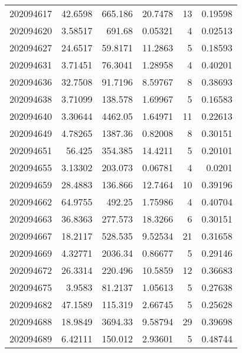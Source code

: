 \begin{tabular}{rrrrrr}
 202094617 &         42.6598  &      665.186  &           20.7478  &          13 & 0.19598 \\
 202094620 &          3.58517 &      691.68   &            0.05321 &           4 & 0.02513 \\
 202094627 &         24.6517  &       59.8171 &           11.2863  &           5 & 0.18593 \\
 202094631 &          3.71451 &       76.3041 &            1.28958 &           4 & 0.40201 \\
 202094636 &         32.7508  &       91.7196 &            8.59767 &           8 & 0.38693 \\
 202094638 &          3.71099 &      138.578  &            1.69967 &           5 & 0.16583 \\
 202094640 &          3.30644 &     4462.05   &            1.64971 &          11 & 0.22613 \\
 202094649 &          4.78265 &     1387.36   &            0.82008 &           8 & 0.30151 \\
 202094651 &         56.425   &      354.385  &           14.4211  &           5 & 0.20101 \\
 202094655 &          3.13302 &      203.073  &            0.06781 &           4 & 0.0201  \\
 202094659 &         28.4883  &      136.866  &           12.7464  &          10 & 0.39196 \\
 202094662 &         64.9755  &      492.25   &            1.75986 &           4 & 0.40704 \\
 202094663 &         36.8363  &      277.573  &           18.3266  &           6 & 0.30151 \\
 202094667 &         18.2117  &      528.535  &            9.52534 &          21 & 0.31658 \\
 202094669 &          4.32771 &     2036.34   &            0.86677 &           5 & 0.29146 \\
 202094672 &         26.3314  &      220.496  &           10.5859  &          12 & 0.36683 \\
 202094675 &          3.9583  &       81.2137 &            1.05613 &           5 & 0.27638 \\
 202094682 &         47.1589  &      115.319  &            2.66745 &           5 & 0.25628 \\
 202094688 &         18.9849  &     3694.33   &            9.58794 &          29 & 0.39698 \\
 202094689 &          6.42111 &      150.012  &            2.93601 &           5 & 0.48744 \\

\end{tabular}
